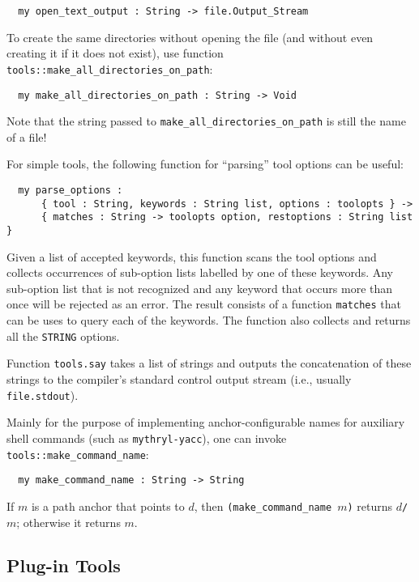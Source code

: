 \begin{verbatim}
  my open_text_output : String -> file.Output_Stream
\end{verbatim}

To create the same directories without opening the file (and without
even creating it if it does not exist), use function {\tt
tools::make_all_directories_on_path}:

\begin{verbatim}
  my make_all_directories_on_path : String -> Void
\end{verbatim}

Note that the string passed to {\tt make_all_directories_on_path}
is still the name of a file!

  For simple tools, the following
function for ``parsing'' tool options can be useful:

\begin{verbatim}
  my parse_options :
      { tool : String, keywords : String list, options : toolopts } ->
      { matches : String -> toolopts option, restoptions : String list }
\end{verbatim}

Given a list of accepted keywords, this function scans the tool
options and collects occurrences of sub-option lists labelled by one
of these keywords.  Any sub-option list that is not recognized and any
keyword that occurs more than once will be rejected as an error.  The
result consists of a function {\tt matches} that can be uses to query
each of the keywords.  The function also collects and returns all the
{\tt STRING} options.

 Function {\tt tools.say}
takes a list of strings and outputs the concatenation
of these strings to the compiler's standard control output stream
(i.e., usually {\tt file.stdout}).  

 Mainly for the purpose of
implementing anchor-configurable names for auxiliary shell commands
(such as {\tt mythryl-yacc}), one can invoke {\tt tools::make_command_name}:

\begin{verbatim}
  my make_command_name : String -> String
\end{verbatim}

If $m$ is a path anchor that points to $d$, then {\tt (make_command_name $m$)}
returns $d${\tt /}$m$; otherwise it returns $m$.

\subsection{Plug-in Tools}
\label{sec:plugintools}

